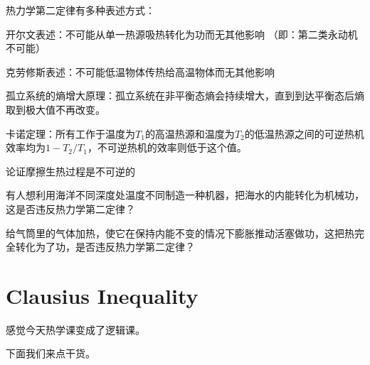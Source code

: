 \documentclass[CJK]{beamer}
\begin{document}
\begin{frame}
\bch
热力学第二定律有多种表述方式：
\bitem
\item{开尔文表述：不可能从单一热源吸热转化为功而无其他影响 （即：第二类永动机不可能）}
\item{克劳修斯表述：不可能低温物体传热给高温物体而无其他影响}
\item{孤立系统的熵增大原理：孤立系统在非平衡态熵会持续增大，直到到达平衡态后熵取到极大值不再改变。}
\item{卡诺定理：所有工作于温度为$T_1$的高温热源和温度为$T_2$的低温热源之间的可逆热机效率均为$1-T_2/T_1$，不可逆热机的效率则低于这个值。}
\eitem
\ech
\end{frame}


\begin{frame}
\bch

\bitem
\item{论证摩擦生热过程是不可逆的}
\eitem

\ech
\end{frame}

\begin{frame}
\bch


\bitem
\item{有人想利用海洋不同深度处温度不同制造一种机器，把海水的内能转化为机械功，这是否违反热力学第二定律？}
\eitem

\ech
\end{frame}


\begin{frame}
\bch


\bitem
\item{给气筒里的气体加热，使它在保持内能不变的情况下膨胀推动活塞做功，这把热完全转化为了功，是否违反热力学第二定律？}
\eitem
\ech
\end{frame}

\section{Clausius Inequality}

\begin{frame}
\bch
\wulian 感觉今天热学课变成了逻辑课。

\skiplines

下面我们来点干货。
\ech
\end{frame}
\end{document}
